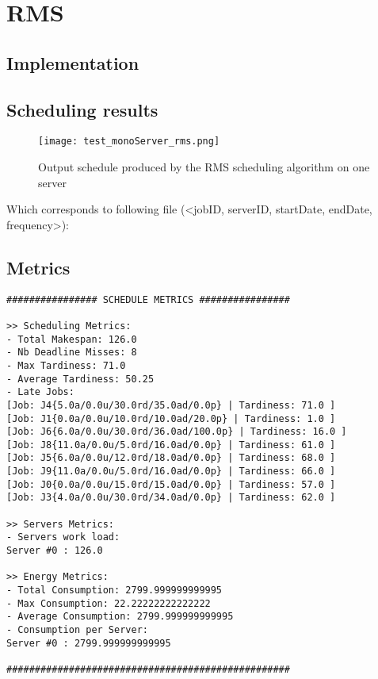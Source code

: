\documentclass[./report.tex]{subfiles}
\begin{document}
\newpage
\section{RMS}
\subsection{Implementation}

\subsection{Scheduling results}
\begin{figure}[!h]
	\center
	\texttt{[image: test\_monoServer\_rms.png]}
	\caption{Output schedule produced by the RMS scheduling algorithm on one server}
	\label{fig:monoServer_rms} 
\end{figure}

Which corresponds to following file (<jobID, serverID, startDate, endDate, frequency>):


\newpage
\subsection{Metrics}
\begin{lstlisting}[style=txt, caption={Metrics for RMS on a single server}]
################ SCHEDULE METRICS ################

>> Scheduling Metrics: 
- Total Makespan: 126.0
- Nb Deadline Misses: 8
- Max Tardiness: 71.0
- Average Tardiness: 50.25
- Late Jobs: 
[Job: J4{5.0a/0.0u/30.0rd/35.0ad/0.0p} | Tardiness: 71.0 ]
[Job: J1{0.0a/0.0u/10.0rd/10.0ad/20.0p} | Tardiness: 1.0 ]
[Job: J6{6.0a/0.0u/30.0rd/36.0ad/100.0p} | Tardiness: 16.0 ]
[Job: J8{11.0a/0.0u/5.0rd/16.0ad/0.0p} | Tardiness: 61.0 ]
[Job: J5{6.0a/0.0u/12.0rd/18.0ad/0.0p} | Tardiness: 68.0 ]
[Job: J9{11.0a/0.0u/5.0rd/16.0ad/0.0p} | Tardiness: 66.0 ]
[Job: J0{0.0a/0.0u/15.0rd/15.0ad/0.0p} | Tardiness: 57.0 ]
[Job: J3{4.0a/0.0u/30.0rd/34.0ad/0.0p} | Tardiness: 62.0 ]

>> Servers Metrics: 
- Servers work load:
Server #0 : 126.0

>> Energy Metrics: 
- Total Consumption: 2799.999999999995
- Max Consumption: 22.22222222222222
- Average Consumption: 2799.999999999995
- Consumption per Server: 
Server #0 : 2799.999999999995

##################################################
\end{lstlisting}
\end{document}
